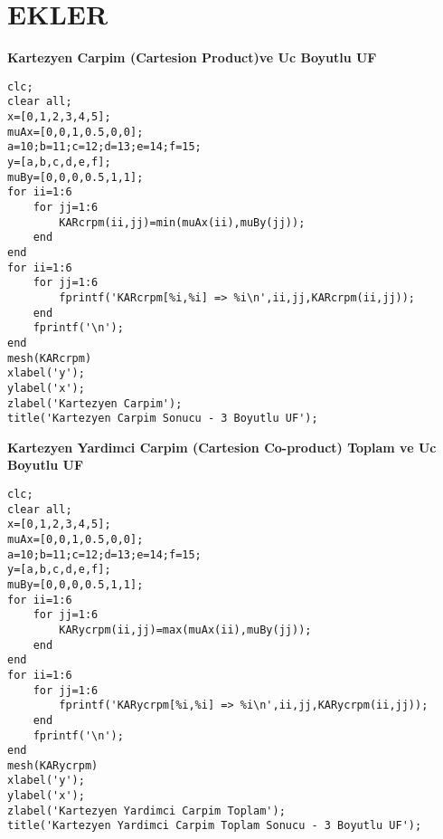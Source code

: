 \section{EKLER}

\textbf{Kartezyen Carpim (Cartesion Product)ve Uc Boyutlu UF}

\begin{verbatim}
clc;
clear all;
x=[0,1,2,3,4,5];
muAx=[0,0,1,0.5,0,0];
a=10;b=11;c=12;d=13;e=14;f=15;
y=[a,b,c,d,e,f];
muBy=[0,0,0,0.5,1,1];
for ii=1:6
    for jj=1:6
        KARcrpm(ii,jj)=min(muAx(ii),muBy(jj));
    end
end
for ii=1:6
    for jj=1:6
        fprintf('KARcrpm[%i,%i] => %i\n',ii,jj,KARcrpm(ii,jj));
    end
    fprintf('\n');
end
mesh(KARcrpm)
xlabel('y');
ylabel('x');
zlabel('Kartezyen Carpim');
title('Kartezyen Carpim Sonucu - 3 Boyutlu UF');
\end{verbatim}

\textbf{Kartezyen Yardimci Carpim (Cartesion Co-product) Toplam ve Uc Boyutlu UF}

\begin{verbatim}
clc;
clear all;
x=[0,1,2,3,4,5];
muAx=[0,0,1,0.5,0,0];
a=10;b=11;c=12;d=13;e=14;f=15;
y=[a,b,c,d,e,f];
muBy=[0,0,0,0.5,1,1];
for ii=1:6
    for jj=1:6
        KARycrpm(ii,jj)=max(muAx(ii),muBy(jj));
    end
end
for ii=1:6
    for jj=1:6
        fprintf('KARycrpm[%i,%i] => %i\n',ii,jj,KARycrpm(ii,jj));
    end
    fprintf('\n');
end
mesh(KARycrpm)
xlabel('y');
ylabel('x');
zlabel('Kartezyen Yardimci Carpim Toplam');
title('Kartezyen Yardimci Carpim Toplam Sonucu - 3 Boyutlu UF');
\end{verbatim}